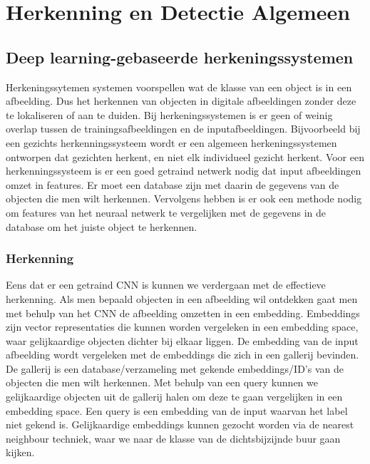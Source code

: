\chapter{Herkenning en Detectie Algemeen}

\section{Deep learning-gebaseerde herkeningssystemen}
Herkeningssytemen systemen voorspellen wat de klasse van een object is in een afbeelding. 
Dus het herkennen van objecten in digitale afbeeldingen zonder deze te lokaliseren of aan te duiden. 
Bij herkeningssystemen is er geen of weinig overlap tussen de trainingsafbeeldingen en de inputafbeeldingen.
Bijvoorbeeld bij een gezichts herkenningssysteem wordt er een algemeen herkeningssystemen ontworpen dat gezichten herkent, en niet elk individueel gezicht herkent.
Voor een herkenningssysteem is er een goed getraind netwerk nodig dat input afbeeldingen omzet in features. 
Er moet een database zijn met daarin de gegevens van de objecten die men wilt herkennen. 
Vervolgens hebben is er ook een methode nodig om features van het neuraal netwerk te vergelijken met de gegevens in de database om het juiste object te herkennen.

\subsection{Herkenning}
Eens dat er een getraind CNN is kunnen we verdergaan met de effectieve herkenning. 
Als men bepaald objecten in een afbeelding wil ontdekken gaat men met behulp van het CNN de afbeelding omzetten in een embedding. 
Embeddings zijn vector representaties die kunnen worden vergeleken in een embedding space, waar gelijkaardige objecten dichter bij elkaar liggen. De embedding van de input afbeelding wordt vergeleken met de embeddings die zich in een gallerij bevinden. 
De gallerij is een database/verzameling met gekende embeddings/ID's van de objecten die men wilt herkennen.
Met behulp van een query kunnen we gelijkaardige objecten uit de gallerij halen om deze te gaan vergelijken in een embedding space. 
Een query is een embedding van de input waarvan het label niet gekend is.
Gelijkaardige embeddings kunnen gezocht worden via de nearest neighbour techniek, waar we naar de klasse van de dichtsbijzijnde buur gaan kijken.

